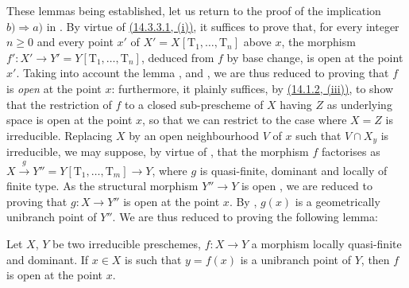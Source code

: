 These lemmas being established, let us return to the proof of the implication $b)\Rightarrow a)$ in .
By virtue of {\hyperlink{ega4.c04.subsec.14-3-3-1}{(14.3.3.1, (i))}}, it suffices to prove that, for every integer $n\geq 0$ and every point $x'$ of $X'=X[\mathrm{T}_1,\ldots,\mathrm{T}_n]$ above $x$, the morphism
$f':X'\to Y'=Y[\mathrm{T}_1,\ldots,\mathrm{T}_n]$, deduced from $f$ by base change, is open at the point $x'$.
Taking into account the lemma ,  and , we are thus reduced to proving that $f$ is \emph{open} at the point $x$: furthermore, it plainly suffices, by {\hyperlink{ega4.c04.prop.14-1-2}{(14.1.2, (iii))}}, to show that the restriction of $f$ to a closed sub-prescheme of $X$ having $Z$ as underlying space is open at the point $x$, so that we can restrict to the case where $X=Z$ is irreducible.
Replacing $X$ by an open neighbourhood $V$ of $x$ such that $V\cap X_y$ is irreducible, we may suppose, by virtue of , that the morphism $f$ factorises as $X\xrightarrow{g}Y''=Y[\mathrm{T}_1,\ldots,\mathrm{T}_m]\to Y$, where $g$ is quasi-finite, dominant and locally of finite type.
As the structural morphism $Y''\to Y$ is open , we are reduced to proving that $g:X\to Y''$ is open at the point $x$.
By , $g(x)$ is a geometrically unibranch point of $Y''$.
We are thus reduced to proving the following lemma:

\begin{lemma}[14.4.1.3]
\label{IV.14.4.1.3}
Let $X$, $Y$ be two irreducible preschemes, $f:X\to Y$ a morphism locally quasi-finite and dominant.
If $x\in X$ is such that $y=f(x)$ is a unibranch point of $Y$, then $f$ is open at the point $x$.
\end{lemma}

